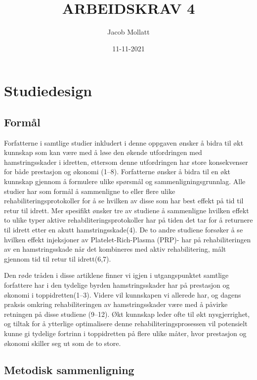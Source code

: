\documentclass[
]{article}
\title{ARBEIDSKRAV 4}
\author{Jacob Mollatt}
\date{11-11-2021}
\begin{document}
\maketitle

\hypertarget{studiedesign}{%
\section{Studiedesign}\label{studiedesign}}

\hypertarget{formuxe5l}{%
\subsection{Formål}\label{formuxe5l}}

Forfatterne i samtlige studier inkludert i denne oppgaven ønsker å bidra
til økt kunnskap som kan være med å løse den økende utfordringen med
hamstringsskader i idretten, ettersom denne utfordringen har store
konsekvenser for både prestasjon og økonomi (1--8). Forfatterne ønsker å
bidra til en økt kunnskap gjennom å formulere ulike spørsmål og
sammenligningsgrunnlag. Alle studier har som formål å sammenligne to
eller flere ulike rehabiliteringsprotokoller for å se hvilken av disse
som har best effekt på tid til retur til idrett. Mer spesifikt ønsker
tre av studiene å sammenligne hvilken effekt to ulike typer aktive
rehabiliteringsprotokoller har på tiden det tar for å returnere til
idrett etter en akutt hamstringsskade(4). De to andre studiene forsøker
å se hvilken effekt injeksjoner av Platelet-Rich-Plasma (PRP)- har på
rehabiliteringen av en hamstringsskade når det kombineres med aktiv
rehabilitering, målt gjennom tid til retur til idrett(6,7).

Den røde tråden i disse artiklene finner vi igjen i utgangspunktet
samtlige forfattere har i den tydelige byrden hamstringsskader har på
prestasjon og økonomi i toppidretten(1--3). Videre vil kunnskapen vi
allerede har, og dagens praksis omkring rehabiliteringen av
hamstringsskader være med å påvirke retningen på disse studiene (9--12).
Økt kunnskap leder ofte til økt nysgjerrighet, og tiltak for å ytterlige
optimalisere denne rehabiliteringsprosessen vil potensielt kunne gi
tydelige fortrinn i toppidretten på flere ulike måter, hvor prestasjon
og økonomi skiller seg ut som de to store.

\hypertarget{metodisk-sammenligning}{%
\subsection{Metodisk sammenligning}\label{metodisk-sammenligning}}
\end{document}
